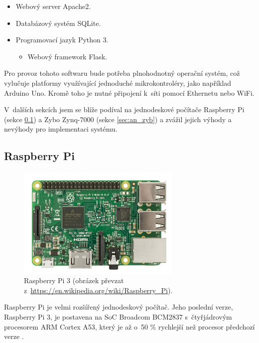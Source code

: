 \begin{itemize}
    \item Webový server Apache2.
    \item Databázový systém SQLite.
    \item Programovací jazyk Python 3.
    \begin{itemize}
        \item Webový framework Flask.
    \end{itemize}
\end{itemize}

Pro provoz tohoto softwaru bude potřeba plnohodnotný operační systém, což vylučuje platformy využívající jednoduché mikrokontroléry, jako například Arduino Uno. Kromě toho je nutné připojení k~síti pomocí Ethernetu nebo WiFi. 

V~dalších sekcích jsem se blíže podíval na jednodeskové počítače Raspberry Pi (sekce \ref{sec:an_rpi}) a Zybo Zynq-7000 (sekce \ref{sec:an_zyb}) a zvážil jejich výhody a nevýhody pro implementaci systému.

\subsection{Raspberry Pi}
\label{sec:an_rpi}

\begin{figure}[h!]
    \centering
    \includegraphics[width=0.7\textwidth]{images/rpi.jpg}
    \caption[Raspberry Pi 3]{Raspberry Pi 3 (obrázek převzat z~\url{https://en.wikipedia.org/wiki/Raspberry_Pi}).}
    \label{fig:rpi}
\end{figure}

Raspberry Pi je velmi rozšířený jednodeskový počítač. Jeho poslední verze, Raspberry Pi 3, je postavena na SoC Broadcom BCM2837 s~čtyřjádrovým procesorem ARM Cortex A53, který je až o~50 \% rychlejší než procesor předchozí verze \cite{rpi_benchoff}.

